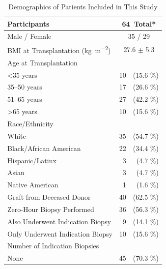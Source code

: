 
\begin{table}[tbp]
    \centering
    \caption{Demographics of Patients Included in This Study}
    \begin{tabular}{lrr}
        \toprule
        Participants & 
        \multicolumn{2}{c}{64~Total*}\\\midrule
        Male / Female & \multicolumn{2}{c}{35 / 29} \\
        BMI at Transplantation (\unit{\kilo\gram\per\meter\squared}) & \multicolumn{2}{c}{27.6 $\pm$ 5.3} \\
        Age at Transplantation & & \\
        \hspace{2em}\textless 35 years & 10 & (15.6 \%)\\
        \hspace{2em}35--50 years & 17 & (26.6 \%)\\
        \hspace{2em}51--65 years & 27 & (42.2 \%)\\
        \hspace{2em}\textgreater 65 years & 10 & (15.6 \%)\\
        Race/Ethnicity & & \\
        \hspace{2em}White & 35 & (54.7 \%)\\
        \hspace{2em}Black/African American & 22 & (34.4 \%)\\
        \hspace{2em}Hispanic/Latinx & 3 & (4.7 \%)\\
        \hspace{2em}Asian & 3 & (4.7 \%)\\
        \hspace{2em}Native American & 1 & (1.6 \%)\\
        Graft from Deceased Donor & 40 & (62.5 \%)\\
        Zero-Hour Biopsy Performed & 36 & (56.3 \%)\\
        \hspace{2em}Also Underwent Indication Biopsy & 9 & (14.1 \%)\\
        Only Underwent Indication Biopsy & 10 & (15.6 \%)\\
        Number of Indication Biopsies & & \\
        \hspace{2em}None & 45 & (70.3 \%)\\

\end{tabular}
\end{table}
